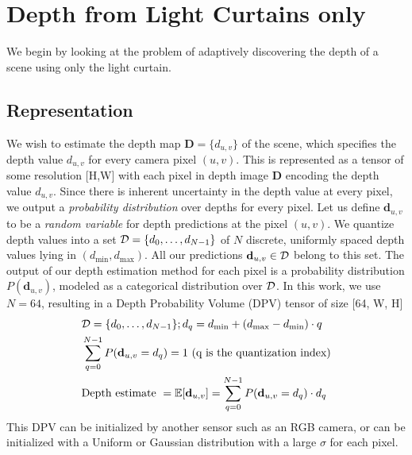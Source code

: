 
\section{Depth from Light Curtains only}

\newcommand{\DD}{\mathbf{D}}
\newcommand{\dd}{\mathbf{d}}

We begin by looking at the problem of adaptively discovering the depth of a scene using only the light curtain.

\subsection{Representation}

\smallskip
We wish to estimate the depth map $\DD = \{d_{u, v}\}$ of the scene, which specifies the depth value $d_{u, v}$ for every camera pixel $(u, v)$. This is represented as a tensor of some resolution [H,W] with each pixel in depth image $\DD$ encoding the depth value $d_{u,v}$. Since there is inherent uncertainty in the depth value at every pixel, we output a \textit{probability distribution} over depths for every pixel. Let us define $\dd_{u,v}$ to be a \textit{random variable} for depth predictions at the pixel $(u, v)$. We quantize depth values into a set $\mathcal{D} = \{d_0, \dots, d_{N-1}\}$ of $N$ discrete, uniformly spaced depth values lying in $(d_\text{min}, d_\text{max})$. All our predictions $\dd_{u, v} \in \D$ belong to this set. The output of our depth estimation method for each pixel is a probability distribution $P(\dd_{u, v})$, modeled as a categorical distribution over $\mathcal{D}$. In this work, we use $N=64$, resulting in a Depth Probability Volume (DPV) tensor of size [64, W, H]
\begin{align}
   &\D=\{d_0, \dots, d_{N-1}\}; d_{q}=d_\text{min}+(d_\text{max}-d_\text{min}) \cdot q
   \label{eq:d_candi}
   \\
   &\sum_{q=0}^{N-1} P(\dd_{u,v} = d_q) =1 \ \text{(q is the quantization index)}
   \label{eq:depth_dist}\\
   &\text{Depth estimate } = \mathbb{E} [ \dd_{u,v}] = \sum_{q=0}^{N-1} P(\dd_{u,v}=d_q)\cdot d_q
\end{align}
This DPV can be initialized by another sensor such as an RGB camera, or can be initialized with a Uniform or Gaussian distribution with a large $\sigma$ for each pixel.

